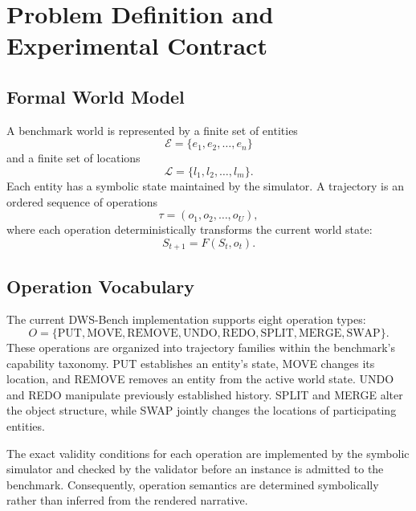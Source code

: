 \documentclass{iutbscthesis}
\begin{document}
\chapter{Problem Definition and Experimental Contract}
\section{Formal World Model}
A benchmark world is represented by a finite set of entities
\[
\mathcal{E}=\{e_1,e_2,\ldots,e_n\}
\]
and a finite set of locations
\[
\mathcal{L}=\{l_1,l_2,\ldots,l_m\}.
\]
Each entity has a symbolic state maintained by the simulator. A trajectory is an ordered sequence of
operations
\[
\tau=(o_1,o_2,\ldots,o_U),
\]
where each operation deterministically transforms the current world state:
\[
S_{t+1}=F(S_t,o_t).
\]

\section{Operation Vocabulary}
The current DWS-Bench implementation supports eight operation types:
\[
O=\{\text{PUT},\text{MOVE},\text{REMOVE},\text{UNDO},\text{REDO},
\text{SPLIT},\text{MERGE},\text{SWAP}\}.
\]
These operations are organized into trajectory families within the benchmark's capability taxonomy.
PUT establishes an entity's state, MOVE changes its location, and REMOVE removes an entity from the
active world state. UNDO and REDO manipulate previously established history. SPLIT and MERGE alter
the object structure, while SWAP jointly changes the locations of participating entities.

The exact validity conditions for each operation are implemented by the symbolic simulator and checked
by the validator before an instance is admitted to the benchmark. Consequently, operation semantics
are determined symbolically rather than inferred from the rendered narrative.
\end{document}
